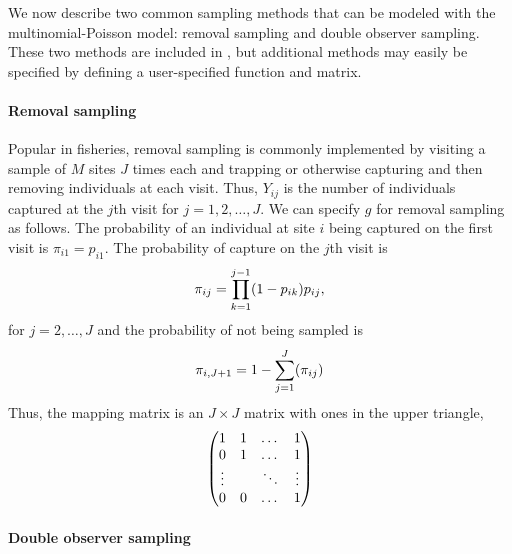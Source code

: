 \documentclass[article,shortnames]{jss}
\newcommand{\um}{\pkg{unmarked}}
\begin{document}
We now describe two common sampling methods that can be modeled
with the multinomial-Poisson model: removal sampling and double
observer sampling.  These two methods are included in \um, but
additional methods may easily be specified by defining a user-specified 
 function and  matrix.


\paragraph{Removal sampling }

Popular in fisheries, removal sampling is commonly implemented by 
visiting a sample of $M$ sites $J$ times each and trapping or 
otherwise capturing and then removing individuals at each visit.  Thus, 
$Y_{ij}$ is the number of individuals captured at the $j$th visit for 
$j=1,2,\dots,J$. We can specify $g$ for removal sampling as follows.  The
probability of an individual at site $i$ being captured on the first
visit is $\pi_{i1} = p_{i1}$.  The probability of capture on the $j$th
visit is
\begin{equation}
  \pi_{ij} = \prod_{k=1}^{j-1}(1 - p_{ik})p_{ij}, \notag
\end{equation}
for $j=2,\dots,J$ and the probability of not being sampled is
\begin{equation}
  \pi_{i,J+1} = 1 - \sum_{j=1}^{J}(\pi_{ij}) \notag
\end{equation}
Thus, the mapping matrix is an $J \times J$  matrix with ones in
the upper triangle,
\begin{equation}
  \begin{pmatrix}
    1 & 1 & \dots & 1 \\
    0 & 1 & \dots & 1 \\
    \vdots & & \ddots & \vdots \\
    0 & 0 & \dots  & 1 \notag
  \end{pmatrix}
\end{equation}


\paragraph{Double observer sampling}
\label{sec:double-observ-sampl}
\end{document}
